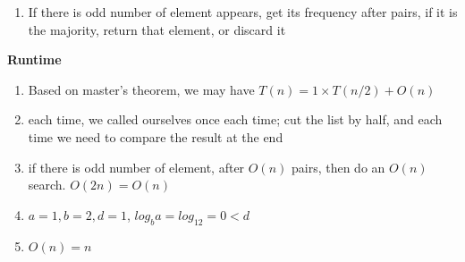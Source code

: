 \documentclass{article}
\def\math#1{$#1$}
\begin{document}
\begin{enumerate}[a)]
\begin{enumerate}[Step 1]
            \item If there is odd number of element appears, get its frequency after pairs, if it is the majority, return that element, or discard it
        \end{enumerate}
        \textbf{Runtime} 
        \begin{enumerate}
            \item Based on master's theorem, we may have \math{T(n) = 1 \times T(n/2) + O(n)}
            \item each time, we called ourselves once each time; cut the list by half, and each time we need to compare the result at the end
            \item if there is odd number of element, after \math{O(n)} pairs, then do an \math{O(n)} search. \math{O(2n) = O(n)}
            \item \math{a = 1, b = 2, d = 1}, \math{log_ba = log_12 = 0 < d}
            \item \math{O(n) = n}
        \end{enumerate}
\end{enumerate}
\end{document}
